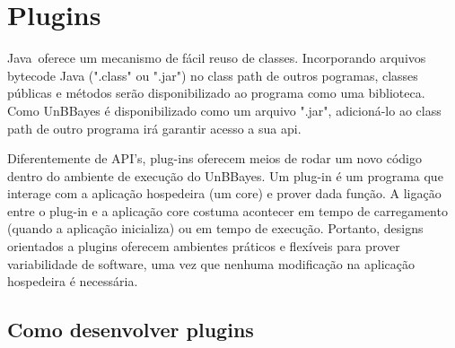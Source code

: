 \section{Plugins}
Java\texttrademark\ oferece um mecanismo de fácil reuso de classes. Incorporando arquivos bytecode Java (".class" ou ".jar") no class path de outros pogramas, classes públicas e métodos serão disponibilizado ao programa como uma biblioteca. Como UnBBayes é disponibilizado como um arquivo ".jar", adicioná-lo ao class path de outro programa irá garantir acesso a sua \gls{api}.

Diferentemente de API's, plug-ins oferecem meios de rodar um novo código dentro do ambiente de execução do UnBBayes. Um plug-in é um programa que interage com a aplicação hospedeira (um core) e prover dada função. A ligação entre o plug-in e a aplicação core costuma acontecer em tempo de carregamento (quando a aplicação inicializa) ou em tempo de execução. Portanto, designs orientados a plugins oferecem ambientes práticos e flexíveis para prover variabilidade de software, uma vez que nenhuma modificação na aplicação hospedeira é necessária.
\subsection{Como desenvolver plugins}